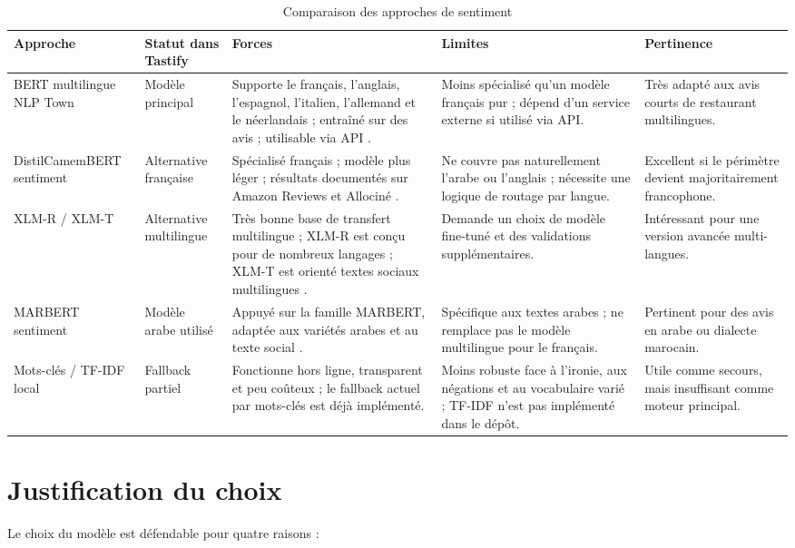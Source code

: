 \begin{table}[p]
\centering
\scriptsize
\caption{Comparaison des approches de sentiment}
\label{tab:comparaison-modeles}
\begin{tabularx}{\textwidth}{p{3.2cm}p{2.5cm}YYY}
\toprule
\textbf{Approche} & \textbf{Statut dans Tastify} & \textbf{Forces} & \textbf{Limites} & \textbf{Pertinence} \\
\midrule
BERT multilingue NLP Town & Modèle principal & Supporte le français, l'anglais, l'espagnol, l'italien, l'allemand et le néerlandais ; entraîné sur des avis ; utilisable via API \cite{nlptown,hftextclassification}. & Moins spécialisé qu'un modèle français pur ; dépend d'un service externe si utilisé via API. & Très adapté aux avis courts de restaurant multilingues. \\
DistilCamemBERT sentiment & Alternative française & Spécialisé français ; modèle plus léger ; résultats documentés sur Amazon Reviews et Allociné \cite{distilcamembert,camembert}. & Ne couvre pas naturellement l'arabe ou l'anglais ; nécessite une logique de routage par langue. & Excellent si le périmètre devient majoritairement francophone. \\
XLM-R / XLM-T & Alternative multilingue & Très bonne base de transfert multilingue ; XLM-R est conçu pour de nombreux langages \cite{xlmroberta}; XLM-T est orienté textes sociaux multilingues \cite{xlmt}. & Demande un choix de modèle fine-tuné et des validations supplémentaires. & Intéressant pour une version avancée multi-langues. \\
MARBERT sentiment & Modèle arabe utilisé & Appuyé sur la famille MARBERT, adaptée aux variétés arabes et au texte social \cite{marbert}. & Spécifique aux textes arabes ; ne remplace pas le modèle multilingue pour le français. & Pertinent pour des avis en arabe ou dialecte marocain. \\
Mots-clés / TF-IDF local & Fallback partiel & Fonctionne hors ligne, transparent et peu coûteux ; le fallback actuel par mots-clés est déjà implémenté. & Moins robuste face à l'ironie, aux négations et au vocabulaire varié ; TF-IDF n'est pas implémenté dans le dépôt. & Utile comme secours, mais insuffisant comme moteur principal. \\
\bottomrule
\end{tabularx}
\end{table}

\section{Justification du choix}
Le choix du modèle  est défendable pour quatre raisons :

